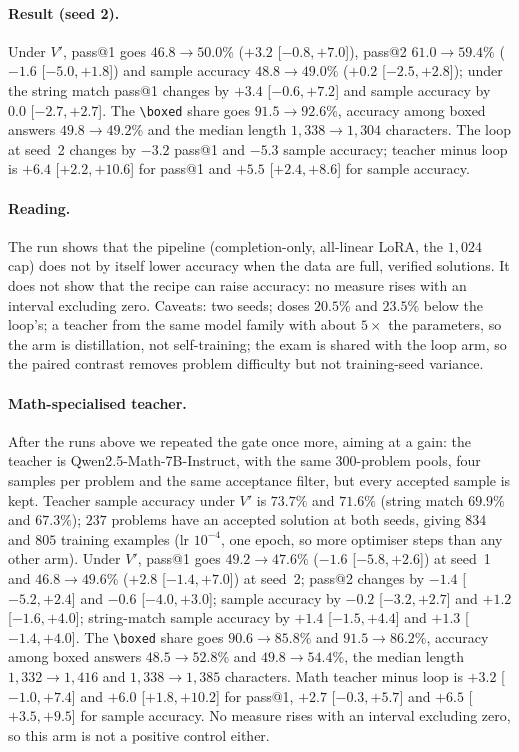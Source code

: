\documentclass[runningheads]{llncs}
\begin{document}
\paragraph{Result (seed 2).} Under $V'$, pass@1 goes $46.8\to50.0\%$ ($+3.2$ [$-0.8,+7.0$]), pass@2 $61.0\to59.4\%$
($-1.6$ [$-5.0,+1.8$]) and sample accuracy $48.8\to49.0\%$ ($+0.2$ [$-2.5,+2.8$]); under the string match pass@1 changes by $+3.4$
[$-0.6,+7.2$] and sample accuracy by $0.0$ [$-2.7,+2.7$]. The \verb|\boxed| share goes $91.5\to92.6\%$, accuracy among boxed answers
$49.8\to49.2\%$ and the median length $1{,}338\to1{,}304$ characters. The loop at seed~2 changes by $-3.2$ pass@1 and $-5.3$ sample
accuracy; teacher minus loop is $+6.4$ [$+2.2,+10.6$] for pass@1 and $+5.5$ [$+2.4,+8.6$] for sample accuracy.

\paragraph{Reading.} The run shows that the pipeline (completion-only, all-linear LoRA, the $1{,}024$ cap) does not by itself lower
accuracy when the data are full, verified solutions. It does not show that the recipe can raise accuracy: no measure rises with an
interval excluding zero. Caveats: two seeds; doses $20.5\%$ and $23.5\%$ below the loop's; a teacher from the same model family with about $5\times$ the
parameters, so the arm is distillation, not self-training; the exam is shared with the loop arm, so the paired contrast removes
problem difficulty but not training-seed variance.

\paragraph{Math-specialised teacher.} After the runs above we repeated the gate once more, aiming at a gain: the teacher is
Qwen2.5-Math-7B-Instruct, with the same $300$-problem pools, four samples per problem and the same acceptance filter, but every
accepted sample is kept. Teacher sample accuracy under $V'$ is $73.7\%$ and $71.6\%$ (string match $69.9\%$ and $67.3\%$); $237$
problems have an accepted solution at both seeds, giving $834$ and $805$ training examples (lr $10^{-4}$, one epoch, so more
optimiser steps than any other arm). Under $V'$, pass@1 goes $49.2\to47.6\%$ ($-1.6$ [$-5.8,+2.6$]) at seed~1 and $46.8\to49.6\%$
($+2.8$ [$-1.4,+7.0$]) at seed~2; pass@2 changes by $-1.4$ [$-5.2,+2.4$] and $-0.6$ [$-4.0,+3.0$]; sample accuracy by $-0.2$
[$-3.2,+2.7$] and $+1.2$ [$-1.6,+4.0$]; string-match sample accuracy by $+1.4$ [$-1.5,+4.4$] and $+1.3$ [$-1.4,+4.0$]. The
\verb|\boxed| share goes $90.6\to85.8\%$ and $91.5\to86.2\%$, accuracy among boxed answers $48.5\to52.8\%$ and $49.8\to54.4\%$,
the median length $1{,}332\to1{,}416$ and $1{,}338\to1{,}385$ characters. Math teacher minus loop is $+3.2$ [$-1.0,+7.4$] and
$+6.0$ [$+1.8,+10.2$] for pass@1, $+2.7$ [$-0.3,+5.7$] and $+6.5$ [$+3.5,+9.5$] for sample accuracy. No measure rises with an
interval excluding zero, so this arm is not a positive control either.
\end{document}
